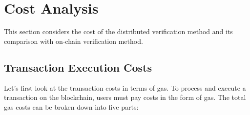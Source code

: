 \documentclass[runningheads]{llncs}
\begin{document}


 
\section{Cost Analysis}
This section considers the cost of the distributed verification method and its comparison with on-chain verification method.

\subsection{Transaction Execution Costs}
Let's first look at the transaction costs in terms of gas. To process and execute a transaction on the blockchain, users must pay costs in the form of gas. The total gas costs can be broken down into five parts:
\end{document}
